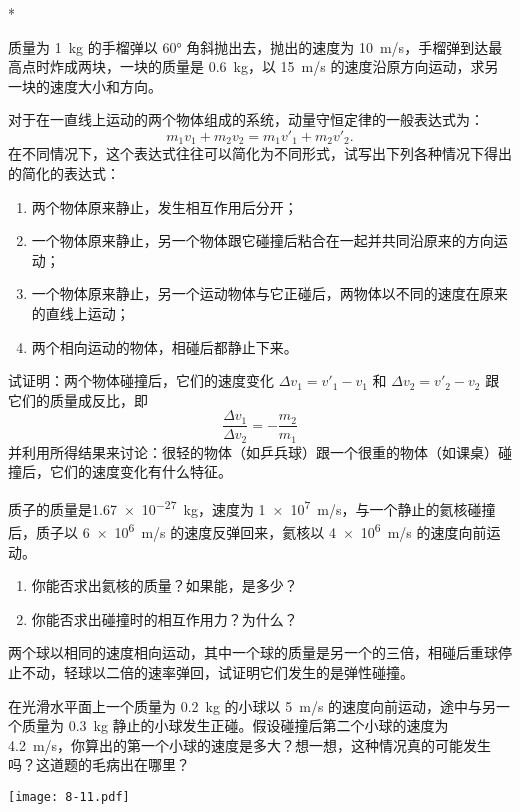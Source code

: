 \begin{Exercise}*
\begin{question}
  \item 质量为 \qty{1}{kg} 的手榴弹以 \ang{60} 角斜抛出去，抛出的速度为 \qty{10}{m/s}，手榴弹到达最高点时炸成两块，一块的质量是 \qty{0.6}{kg}，以 \qty{15}{m/s} 的速度沿原方向运动，求另一块的速度大小和方向。
  \item 对于在一直线上运动的两个物体组成的系统，动量守恒定律的一般表达式为：
\[m_1v_1+m_2v_2=m_1v'_1+m_2v'_2.\]
  在不同情况下，这个表达式往往可以简化为不同形式，试写出下列各种情况下得出的简化的表达式：
\begin{enumerate}
  \item 两个物体原来静止，发生相互作用后分开；
  \item 一个物体原来静止，另一个物体跟它碰撞后粘合在一起并共同沿原来的方向运动；
  \item 一个物体原来静止，另一个运动物体与它正碰后，两物体以不同的速度在原来的直线上运动；
  \item 两个相向运动的物体，相碰后都静止下来。
\end{enumerate}
  \item 试证明：两个物体碰撞后，它们的速度变化 $\Delta v_1=v'_1-v_1$ 和 $\Delta v_2=v'_2-v_2$ 跟它们的质量成反比，即
  \[\frac{\Delta v_1}{\Delta v_2}=-\frac{m_2}{m_1}\]
  并利用所得结果来讨论：很轻的物体（如乒兵球）跟一个很重的物体（如课桌）碰撞后，它们的速度变化有什么特征。
  \item 质子的质量是\qty{1.67e-27}{kg}，速度为 \qty{1e7}{m/s}，与一个静止的氦核碰撞后，质子以 \qty{6e6}{m/s} 的速度反弹回来，氦核以 \qty{4e6}{m/s} 的速度向前运动。
  \begin{enumerate}
    \item 你能否求出氦核的质量？如果能，是多少？
    \item 你能否求出碰撞时的相互作用力？为什么？
  \end{enumerate}
  \item 两个球以相同的速度相向运动，其中一个球的质量是另一个的三倍，相碰后重球停止不动，轻球以二倍的速率弹回，试证明它们发生的是弹性碰撞。
   \item 在光滑水平面上一个质量为 \qty{0.2}{kg} 的小球以 \qty{5}{m/s} 的速度向前运动，途中与另一个质量为 \qty{0.3}{kg} 静止的小球发生正碰。假设碰撞后第二个小球的速度为 \qty{4.2}{m/s}，你算出的第一个小球的速度是多大？想一想，这种情况真的可能发生吗？这道题的毛病出在哪里？
\begin{figurehere}
  \begin{minipage}{\linewidth}\centering
    \texttt{[image: 8-11.pdf]}

\end{minipage}
\end{figurehere}
\end{question}
\end{Exercise}
